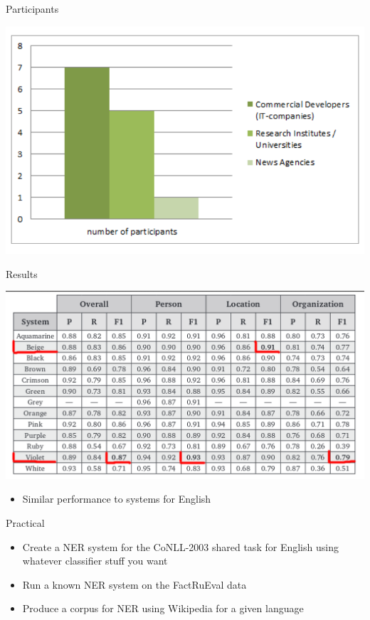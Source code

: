 \documentclass[10pt, compress]{beamer}
\begin{document}
\begin{frame}{Participants}

\begin{center}
\includegraphics[width=\textwidth]{graphics/factrueval-participants.png}
\end{center}

\end{frame}

\begin{frame}{Results}

\begin{center}
\includegraphics[width=\textwidth]{graphics/factrueval-results.png}
\end{center}

\begin{itemize}
  \item Similar performance to systems for English
\end{itemize}


\end{frame}

\begin{frame}[standout]
Practical
\end{frame}

\begin{frame}

\begin{itemize}
 \item Create a NER system for the CoNLL-2003 shared task for English using
   whatever classifier stuff you want
 \item Run a known NER system on the FactRuEval data
 \item Produce a corpus for NER using Wikipedia for a given language
\end{itemize}

\end{frame}
\end{document}
